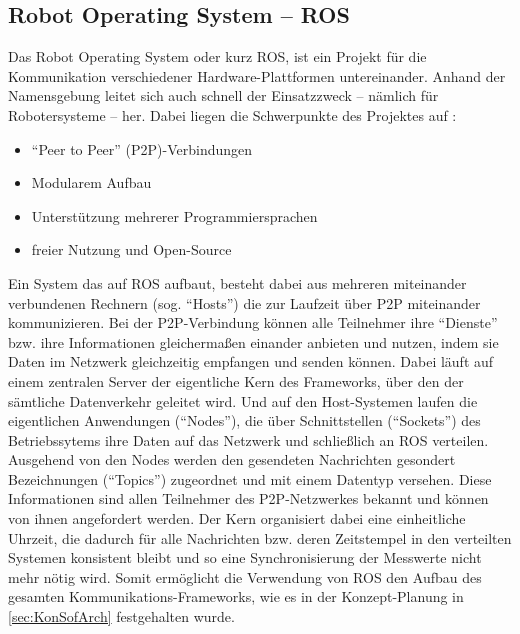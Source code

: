 \subsection{Robot Operating System -- ROS}
Das Robot Operating System oder kurz ROS, ist ein Projekt für die Kommunikation verschiedener Hardware-Plattformen untereinander. Anhand der Namensgebung leitet sich auch schnell der Einsatzzweck -- nämlich für Robotersysteme -- her. Dabei liegen die Schwerpunkte des Projektes auf \cite{ROSPaper}:
\begin{itemize}
\item "`Peer to Peer"' (P2P)-Verbindungen
\item Modularem Aufbau
\item Unterstützung mehrerer Programmiersprachen
\item freier Nutzung und Open-Source
\end{itemize}
Ein System das auf ROS aufbaut, besteht dabei aus mehreren miteinander verbundenen Rechnern (sog. "`Hosts"') die zur Laufzeit über P2P miteinander kommunizieren. Bei der P2P-Verbindung können alle Teilnehmer ihre "`Dienste"' bzw. ihre Informationen gleichermaßen einander anbieten und nutzen, indem sie Daten im Netzwerk gleichzeitig empfangen und senden können. Dabei läuft auf einem zentralen Server der eigentliche Kern des Frameworks, über den der sämtliche Datenverkehr geleitet wird. Und auf den Host-Systemen laufen die eigentlichen Anwendungen ("`Nodes"'), die über Schnittstellen ("`Sockets"') des Betriebssytems ihre Daten auf das Netzwerk und schließlich an ROS verteilen. Ausgehend von den Nodes werden den gesendeten Nachrichten gesondert Bezeichnungen ("`Topics"') zugeordnet und mit einem Datentyp versehen. Diese Informationen sind allen Teilnehmer des P2P-Netzwerkes bekannt und können von ihnen angefordert werden. Der Kern organisiert dabei eine einheitliche Uhrzeit, die dadurch für alle Nachrichten bzw. deren Zeitstempel in den verteilten Systemen konsistent bleibt und so eine Synchronisierung der Messwerte nicht mehr nötig wird. Somit ermöglicht die Verwendung von ROS den Aufbau des gesamten Kommunikations-Frameworks, wie es in der Konzept-Planung in \ref{sec:KonSofArch} festgehalten wurde.
